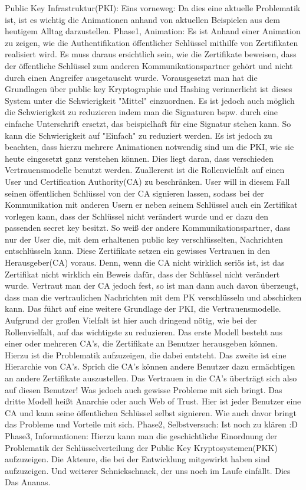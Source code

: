 \documentclass{article}
\begin{document}
Public Key Infrastruktur(PKI):
Eins vorneweg: Da dies eine aktuelle Problematik ist, ist es wichtig die Animationen anhand von aktuellen Beispielen aus dem heutigem Alltag darzustellen.
Phase1, Animation:
Es ist Anhand einer Animation zu zeigen, wie die Authentifikation öffentlicher Schlüssel mithilfe von Zertifikaten realisiert wird. Es muss daraus ersichtlich sein, wie die Zertifikate beweisen, dass der öffentliche Schlüssel zum anderen Kommunikationspartner gehört und nicht durch einen Angreifer ausgetauscht wurde.
Vorausgesetzt man hat die Grundlagen über public key Kryptographie und Hashing verinnerlicht ist dieses System unter die Schwierigkeit "Mittel" einzuordnen. Es ist jedoch auch möglich die Schwierigkeit zu reduzieren indem man die Signaturen bspw. durch eine einfache Unterschrift ersetzt, das beispielhaft für eine Signatur stehen kann. So kann die Schwierigkeit auf "Einfach" zu reduziert werden.
Es ist jedoch zu beachten, dass hierzu mehrere Animationen notwendig sind um die PKI, wie sie heute eingesetzt ganz verstehen können. Dies liegt daran, dass verschieden Vertrauensmodelle benutzt werden. Zuallererst ist die Rollenvielfalt auf einen User und Certification Authority(CA) zu beschränken. User will in diesem Fall seinen öffentlichen Schlüssel von der CA signieren lassen, sodass bei der Kommunikation mit anderen Usern er neben seinem Schlüssel auch ein Zertifikat vorlegen kann, dass der Schlüssel nicht verändert wurde und er dazu den passenden secret key besitzt. So weiß der andere Kommunikationspartner, dass nur der User die, mit dem erhaltenen public key verschlüsselten, Nachrichten entschlüsseln kann. Diese Zertifikate setzen ein gewisses Vertrauen in den Herausgeber(CA) voraus. Denn, wenn die CA nicht wirklich seriös ist, ist das Zertifikat nicht wirklich ein Beweis dafür, dass der Schlüssel nicht verändert wurde. Vertraut man der CA jedoch fest, so ist man dann auch davon überzeugt, dass man die vertraulichen Nachrichten mit dem PK verschlüsseln und abschicken kann. Das führt auf eine weitere Grundlage der PKI, die Vertrauensmodelle. Aufgrund der großen Vielfalt ist hier auch dringend nötig, wie bei der Rollenvielfalt, auf das wichtigste zu reduzieren.
Das erste Modell besteht aus einer oder mehreren CA's, die Zertifikate an Benutzer herausgeben können. Hierzu ist die Problematik aufzuzeigen, die dabei entsteht.
Das zweite ist eine Hierarchie von CA's. Sprich die CA's können andere Benutzer dazu ermächtigen an andere Zertifikate auszustellen. Das Vertrauen in die CA's überträgt sich also auf diesen Benutzer! Was jedoch auch gewisse Probleme mit sich bringt.
Das dritte Modell heißt Anarchie oder auch Web of Trust. Hier ist jeder Benutzer eine CA und kann seine öffentlichen Schlüssel selbst signieren. Wie auch davor bringt das Probleme und Vorteile mit sich.
Phase2, Selbstversuch:
Ist noch zu klären :D
Phase3, Informationen:
Hierzu kann man die geschichtliche Einordnung der Problematik der Schlüsselverteilung der Public Key Kryptosystemen(PKK) aufzuzeigen. Die Akteure, die bei der Entwicklung mitgewirkt haben sind aufzuzeigen. Und weiterer Schnickschnack, der uns noch im Laufe einfällt. Dies Das Ananas.
\end{document}
